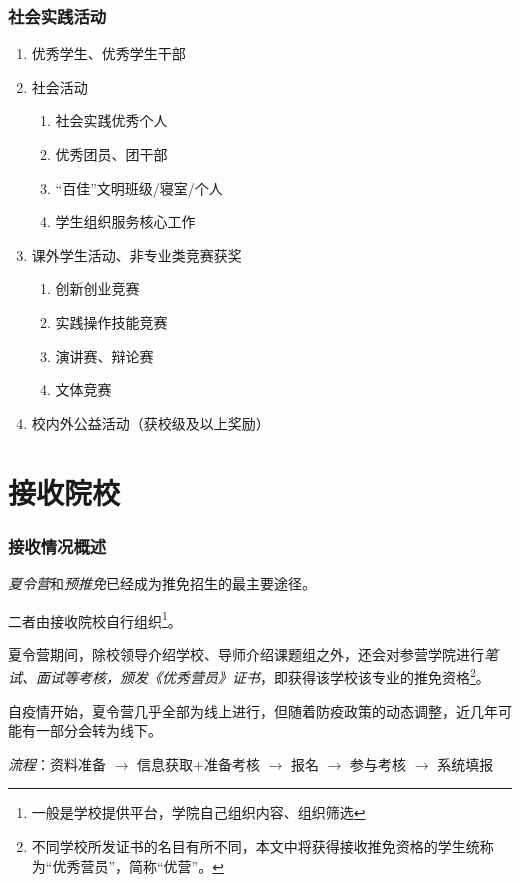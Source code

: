 \begin{frame}
	\frametitle{社会实践活动}

	\begin{enumerate}
		\item 优秀学生、优秀学生干部
		\item 社会活动
		      \begin{enumerate}
			      \item 社会实践优秀个人
			      \item 优秀团员、团干部
			      \item “百佳”文明班级/寝室/个人
			      \item 学生组织服务核心工作
		      \end{enumerate}
		\item 课外学生活动、非专业类竞赛获奖
		      \begin{enumerate}
			      \item 创新创业竞赛
			      \item 实践操作技能竞赛
			      \item 演讲赛、辩论赛
			      \item 文体竞赛
		      \end{enumerate}
		\item 校内外公益活动（获校级及以上奖励）
	\end{enumerate}
\end{frame}


\section{接收院校}

\begin{frame}
	\frametitle{接收情况概述}
	\emph{夏令营}和\emph{预推免}已经成为推免招生的最主要途径。

	二者由接收院校自行组织\footnote{一般是学校提供平台，学院自己组织内容、组织筛选}。

	夏令营期间，除校领导介绍学校、导师介绍课题组之外，还会对参营学院进行\emph{笔试、面试等考核，颁发《优秀营员》证书}，即获得该学校该专业的推免资格\footnote{不同学校所发证书的名目有所不同，本文中将获得接收推免资格的学生统称为“优秀营员”，简称“优营”。}。

	自疫情开始，夏令营几乎全部为线上进行，但随着防疫政策的动态调整，近几年可能有一部分会转为线下。

	\emph{流程}：资料准备 $\rightarrow$ 信息获取+准备考核 $\rightarrow$ 报名 $\rightarrow$ 参与考核 $\rightarrow$ 系统填报
\end{frame}


